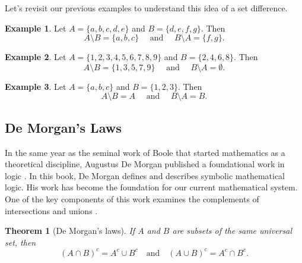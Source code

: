 \documentclass[
]{book}
\newtheorem{theorem}{Theorem}[chapter]
\theoremstyle{definition}
\theoremstyle{definition}
\newtheorem{example}{Example}[chapter]
\theoremstyle{definition}
\theoremstyle{remark}
\begin{document}
Let's revisit our previous examples to understand this idea of a set difference.

\begin{example}
\protect\hypertarget{exm:unnamed-chunk-23}{}{\label{exm:unnamed-chunk-23} } Let \(A = \{a, b, c, d, e\}\) and \(B = \{ d, e, f, g\}\). Then \[A\setminus B=\{a, b, c\} \quad \mbox{ and } \quad  B\setminus A =\{ f, g\}.\]
\end{example}

\begin{example}
\protect\hypertarget{exm:unnamed-chunk-24}{}{\label{exm:unnamed-chunk-24} } Let \(A=\{1,2,3,4,5,6,7,8,9\}\) and \(B=\{2,4,6,8\}\). Then
\[A \setminus B = \{1,3,5,7,9\} \quad \mbox{ and } \quad B\setminus A = \emptyset.\]
\end{example}

\begin{example}
\protect\hypertarget{exm:unnamed-chunk-25}{}{\label{exm:unnamed-chunk-25} } Let \(A=\{a,b,c\}\) and \(B=\{1,2,3\}\). Then
\[A\setminus B = A \quad \mbox{ and } \quad B\setminus A =B.\]
\end{example}

\hypertarget{de-morgans-laws}{%
\subsection{De Morgan's Laws}\label{de-morgans-laws}}

In the same year as the seminal work of Boole \citeyearpar{Boole} that started mathematics as a theoretical discipline, Augustus De Morgan published a foundational work in logic \citep{DeMorgan}. In this book, De Morgan defines and describes symbolic mathematical logic. His work has become the foundation for our current mathematical system. One of the key components of this work examines the complements of intersections and unions \citep[p.~69]{DeMorgan}.

\begin{theorem}[De Morgan's laws]
\protect\hypertarget{thm:unnamed-chunk-26}{}{\label{thm:unnamed-chunk-26} {} }If \(A\) and \(B\) are subsets of the same universal set, then
\[ \left(A \cap B\right)^c = A^c \cup B^c \quad \mbox{and} \quad \left(A \cup B \right)^c = A^c \cap B^c.\]
\end{theorem}
\end{document}

